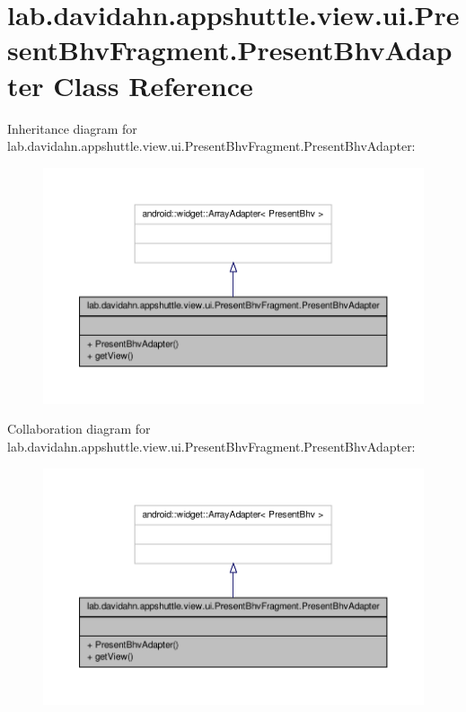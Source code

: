 \hypertarget{classlab_1_1davidahn_1_1appshuttle_1_1view_1_1ui_1_1_present_bhv_fragment_1_1_present_bhv_adapter}{\section{lab.\-davidahn.\-appshuttle.\-view.\-ui.\-Present\-Bhv\-Fragment.\-Present\-Bhv\-Adapter \-Class \-Reference}
\label{classlab_1_1davidahn_1_1appshuttle_1_1view_1_1ui_1_1_present_bhv_fragment_1_1_present_bhv_adapter}
}


\-Inheritance diagram for lab.\-davidahn.\-appshuttle.\-view.\-ui.\-Present\-Bhv\-Fragment.\-Present\-Bhv\-Adapter\-:
\nopagebreak
\begin{figure}[H]
\begin{center}
\leavevmode
\includegraphics[width=350pt]{classlab_1_1davidahn_1_1appshuttle_1_1view_1_1ui_1_1_present_bhv_fragment_1_1_present_bhv_adapter__inherit__graph}
\end{center}
\end{figure}


\-Collaboration diagram for lab.\-davidahn.\-appshuttle.\-view.\-ui.\-Present\-Bhv\-Fragment.\-Present\-Bhv\-Adapter\-:
\nopagebreak
\begin{figure}[H]
\begin{center}
\leavevmode
\includegraphics[width=350pt]{classlab_1_1davidahn_1_1appshuttle_1_1view_1_1ui_1_1_present_bhv_fragment_1_1_present_bhv_adapter__coll__graph}
\end{center}
\end{figure}

